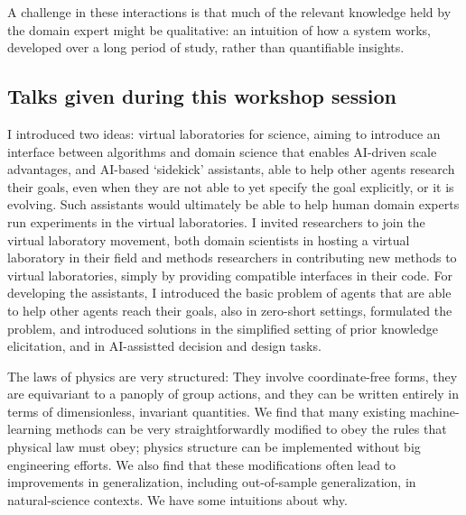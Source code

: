 A challenge in these interactions is that much of the relevant knowledge
held by the domain expert might be qualitative: an intuition of how a
system works, developed over a long period of study, rather than
quantifiable insights.

\subsection{Talks given during this workshop session}

\license

I introduced two ideas: virtual laboratories for science, aiming to introduce an interface between algorithms and domain science that enables AI-driven scale advantages, and AI-based ‘sidekick’ assistants, able to help other agents research their goals, even when they are not able to yet specify the goal explicitly, or it is evolving. Such assistants would ultimately be able to help human domain experts run experiments in the virtual laboratories. I invited researchers to join the virtual laboratory movement, both domain scientists in hosting a virtual laboratory in their field and methods researchers in contributing new methods to virtual laboratories, simply by providing compatible interfaces in their code. For developing the assistants, I introduced the basic problem of agents that are able to help other agents reach their goals, also in zero-short settings, formulated the problem, and introduced solutions in the simplified setting of prior knowledge elicitation, and in AI-assistted decision and design tasks.

\license

The laws of physics are very structured: They involve coordinate-free forms, they are equivariant to a panoply of group actions, and they can be written entirely in terms of dimensionless, invariant quantities. We find that many existing machine-learning methods can be very straightforwardly modified to obey the rules that physical law must obey; physics structure can be implemented without big engineering efforts. We also find that these modifications often lead to improvements in generalization, including out-of-sample generalization, in natural-science contexts. We have some intuitions about why.

